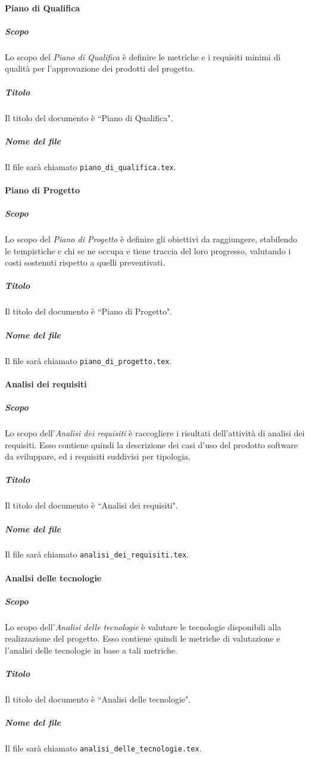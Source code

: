 \documentclass[a4paper, 12pt]{article}
\begin{document}
\paragraph{Piano di Qualifica}\label{documentazione-documenti-piano-di-qualifica}
\subparagraph{Scopo}
Lo scopo del \textit{Piano di Qualifica} è definire le metriche e i requisiti minimi di qualità per l'approvazione dei prodotti del progetto.
\subparagraph{Titolo}
Il titolo del documento è ``Piano di Qualifica".
\subparagraph{Nome del file}
Il file sarà chiamato \texttt{piano\_di\_qualifica.tex}.

\paragraph{Piano di Progetto}\label{piano-di-progetto}
\subparagraph{Scopo}
Lo scopo del \textit{Piano di Progetto} è definire gli obiettivi da raggiungere, stabilendo le tempistiche e chi se ne occupa e tiene traccia del loro progresso, valutando i costi sostenuti rispetto a quelli preventivati.
\subparagraph{Titolo}
Il titolo del documento è ``Piano di Progetto".
\subparagraph{Nome del file}
Il file sarà chiamato \texttt{piano\_di\_progetto.tex}.

\paragraph{Analisi dei requisiti}\label{analisi-dei-requisiti}
\subparagraph{Scopo}
Lo scopo dell'\textit{Analisi dei requisiti} è raccogliere i risultati dell’attività di analisi dei requisiti. Esso contiene quindi la descrizione dei casi d’uso del prodotto software da sviluppare, ed i requisiti suddivisi per tipologia.
\subparagraph{Titolo}
Il titolo del documento è ``Analisi dei requisiti".
\subparagraph{Nome del file}
Il file sarà chiamato \texttt{analisi\_dei\_requisiti.tex}.

\paragraph{Analisi delle tecnologie}\label{analisi-delle-tecnologie}
\subparagraph{Scopo}
Lo scopo dell'\textit{Analisi delle tecnologie} è valutare le tecnologie disponibili alla realizzazione del progetto. Esso contiene quindi le metriche di valutazione e l'analisi delle tecnologie in base a tali metriche.
\subparagraph{Titolo}
Il titolo del documento è ``Analisi delle tecnologie".
\subparagraph{Nome del file}
Il file sarà chiamato \texttt{analisi\_delle\_tecnologie.tex}.
\end{document}

